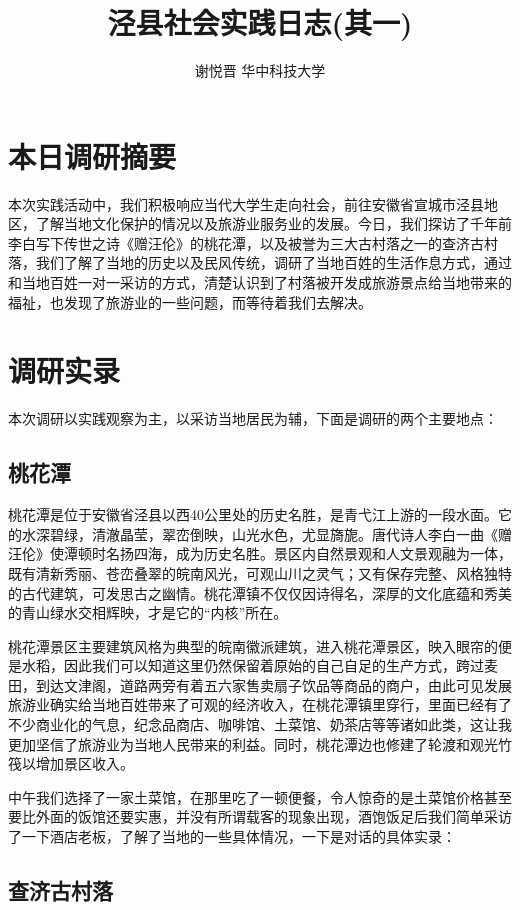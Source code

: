 \documentclass[a4paper,11pt,UTF8]{article}
\title{泾县社会实践日志(其一)}
\author{谢悦晋 \quad 华中科技大学}
\begin{document}
\maketitle
\section{本日调研摘要}
本次实践活动中，我们积极响应当代大学生走向社会，前往安徽省宣城市泾县地区，了解当地文化保护的情况以及旅游业服务业的发展。今日，我们探访了千年前李白写下传世之诗《赠汪伦》的桃花潭，以及被誉为三大古村落之一的查济古村落，我们了解了当地的历史以及民风传统，调研了当地百姓的生活作息方式，通过和当地百姓一对一采访的方式，清楚认识到了村落被开发成旅游景点给当地带来的福祉，也发现了旅游业的一些问题，而等待着我们去解决。


\section{调研实录}
本次调研以实践观察为主，以采访当地居民为辅，下面是调研的两个主要地点：
\subsection{桃花潭}
桃花潭是位于安徽省泾县以西40公里处的历史名胜，是青弋江上游的一段水面。它的水深碧绿，清澈晶莹，翠峦倒映，山光水色，尤显旖旎。唐代诗人李白一曲《赠汪伦》使潭顿时名扬四海，成为历史名胜。景区内自然景观和人文景观融为一体，既有清新秀丽、苍峦叠翠的皖南风光，可观山川之灵气；又有保存完整、风格独特的古代建筑，可发思古之幽情。桃花潭镇不仅仅因诗得名，深厚的文化底蕴和秀美的青山绿水交相辉映，才是它的“内核”所在。


桃花潭景区主要建筑风格为典型的皖南徽派建筑，进入桃花潭景区，映入眼帘的便是水稻，因此我们可以知道这里仍然保留着原始的自己自足的生产方式，跨过麦田，到达文津阁，道路两旁有着五六家售卖扇子饮品等商品的商户，由此可见发展旅游业确实给当地百姓带来了可观的经济收入，在桃花潭镇里穿行，里面已经有了不少商业化的气息，纪念品商店、咖啡馆、土菜馆、奶茶店等等诸如此类，这让我更加坚信了旅游业为当地人民带来的利益。同时，桃花潭边也修建了轮渡和观光竹筏以增加景区收入。


中午我们选择了一家土菜馆，在那里吃了一顿便餐，令人惊奇的是土菜馆价格甚至要比外面的饭馆还要实惠，并没有所谓载客的现象出现，酒饱饭足后我们简单采访了一下酒店老板，了解了当地的一些具体情况，一下是对话的具体实录：
\subsection{查济古村落}
\end{document}
